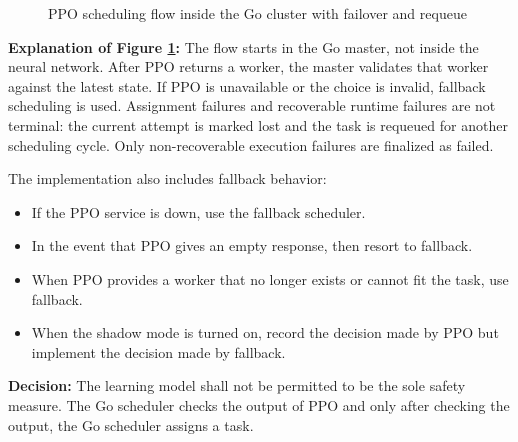 \begin{figure}[p!]
{%
    }
    \caption{PPO scheduling flow inside the Go cluster with failover and requeue}
    \label{fig:ppo_cluster_flow}
\end{figure}
\clearpage

\textbf{Explanation of Figure \ref{fig:ppo_cluster_flow}:} The flow starts in the Go master, not inside the neural network. After PPO returns a worker, the master validates that worker against the latest state. If PPO is unavailable or the choice is invalid, fallback scheduling is used. Assignment failures and recoverable runtime failures are not terminal: the current attempt is marked lost and the task is requeued for another scheduling cycle. Only non-recoverable execution failures are finalized as failed.

The implementation also includes fallback behavior:

\begin{itemize}
    \item If the PPO service is down, use the fallback scheduler.
    \item In the event that PPO gives an empty response, then resort to fallback.
    \item When PPO provides a worker that no longer exists or cannot fit the task, use fallback.
    \item When the shadow mode is turned on, record the decision made by PPO but implement the decision made by fallback.
\end{itemize}

\textbf{Decision:} The learning model shall not be permitted to be the sole safety measure. The Go scheduler checks the output of PPO and only after checking the output, the Go scheduler assigns a task.
